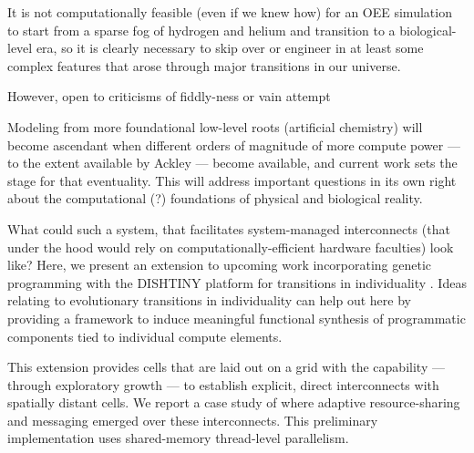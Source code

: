 \begin{displayquote}
It is not computationally feasible (even if we knew how) for an OEE simulation to start from a sparse fog of hydrogen and helium and transition to a biological-level era, so it is clearly necessary to skip over or engineer in at least some complex features that arose through major transitions in our universe. \citep{channon2019maximum}
\end{displayquote}

However, open to criticisms of fiddly-ness or vain attempt \citep{lehmanTODO}

Modeling from more foundational low-level roots (artificial chemistry) will become ascendant when different orders of magnitude of more compute power --- to the extent available by Ackley --- become available, and current work sets the stage for that eventuality. \citep{ackley2018alife}
This will address important questions in its own right about the computational (?) foundations of physical and biological reality.

What could such a system, that facilitates system-managed interconnects (that under the hood  would rely on computationally-efficient hardware faculties) look like?
Here, we present an extension to upcoming work incorporating genetic programming with the DISHTINY platform for transitions in individuality \citep{moreno2019toward}.
Ideas relating to evolutionary transitions in individuality can help out here by providing a framework to induce meaningful functional synthesis of programmatic components tied to individual compute elements.


This extension provides cells that are laid out on a grid with the capability --- through exploratory growth --- to establish explicit, direct interconnects with spatially distant cells.
We report a case study of where adaptive resource-sharing and messaging emerged over these interconnects.
This preliminary implementation uses shared-memory thread-level parallelism.
